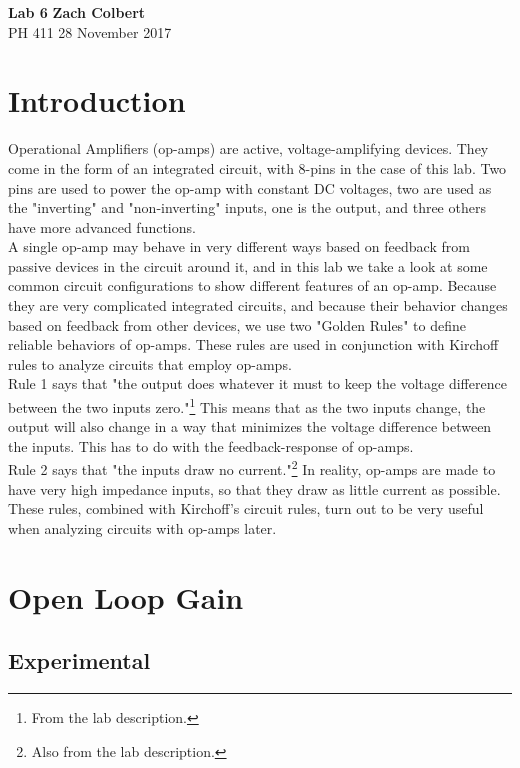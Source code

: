 \documentclass[11pt]{article}
\begin{document}
\noindent
\large\textbf{Lab 6} \hfill \textbf{Zach Colbert} \\
\normalsize PH 411 \hfill 28 November 2017\\

\section*{Introduction}
Operational Amplifiers (op-amps) are active, voltage-amplifying devices. They come in the form of an integrated circuit, with 8-pins in the case of this lab. Two pins are used to power the op-amp with constant DC voltages, two are used as the "inverting" and "non-inverting" inputs, one is the output, and three others have more advanced functions.\\

A single op-amp may behave in very different ways based on feedback from passive devices in the circuit around it, and in this lab we take a look at some common circuit configurations to show different features of an op-amp. Because they are very complicated integrated circuits, and because their behavior changes based on feedback from other devices, we use two "Golden Rules" to define reliable behaviors of op-amps. These rules are used in conjunction with Kirchoff rules to analyze circuits that employ op-amps.\\

Rule 1 says that "the output does whatever it must to keep the voltage difference between the two inputs zero."\footnote{From the lab description.} This means that as the two inputs change, the output will also change in a way that minimizes the voltage difference between the inputs. This has to do with the feedback-response of op-amps.\\

Rule 2 says that "the inputs draw no current."\footnote{Also from the lab description.} In reality, op-amps are made to have very high impedance inputs, so that they draw as little current as possible. These rules, combined with Kirchoff's circuit rules, turn out to be very useful when analyzing circuits with op-amps later.\\


\section{Open Loop Gain}
\subsection{Experimental}
\end{document}
